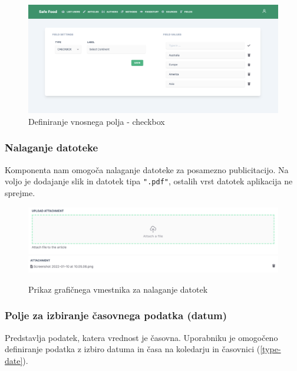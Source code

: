 \documentclass[a4paper, 12pt]{book}
\begin{document}
\begin{figure}[H]
\begin{center}
\includegraphics[width=1\textwidth]{slike/type_checkbox.png}
\end{center}
\caption{ Definiranje vnosnega polja - checkbox }
\label{type-checkbox}
\end{figure}


\subsubsection{Nalaganje datoteke}
Komponenta nam omogoča nalaganje datoteke za posamezno publicitacijo. Na voljo je dodajanje slik in datotek tipa \verb=".pdf"=, ostalih vrst datotek aplikacija ne sprejme.
\begin{figure}[h]
\begin{center}
\includegraphics[width=1\textwidth]{slike/upload_file_zone.png}
\includegraphics[width=1\textwidth]{slike/upload_file_list.png}
\end{center}
\caption{ Prikaz grafičnega vmestnika za nalaganje datotek }
\label{type-checkbox}
\end{figure}

\subsubsection{Polje za izbiranje časovnega podatka (datum)}
Predstavlja podatek, katera vrednost je časovna. Uporabniku je omogočeno definiranje podatka z izbiro datuma in časa na koledarju in časovnici (\ref{type-date}). 
\end{document}
